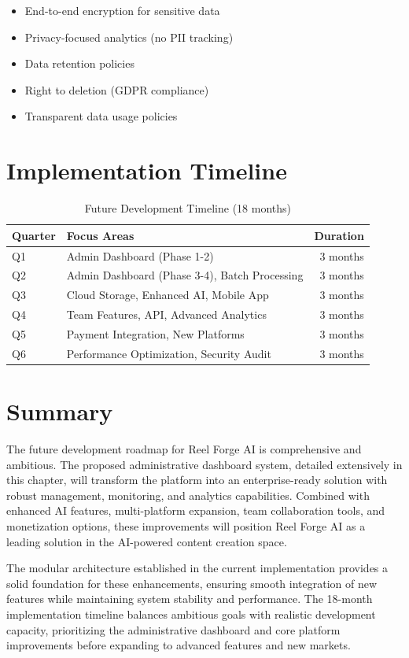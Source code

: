 \begin{itemize}
    \item End-to-end encryption for sensitive data
    \item Privacy-focused analytics (no PII tracking)
    \item Data retention policies
    \item Right to deletion (GDPR compliance)
    \item Transparent data usage policies
\end{itemize}

\section{Implementation Timeline}

\begin{table}[H]
\centering
\caption{Future Development Timeline (18 months)}
\begin{tabular}{@{}llr@{}}
\toprule
\textbf{Quarter} & \textbf{Focus Areas} & \textbf{Duration} \\
\midrule
Q1 & Admin Dashboard (Phase 1-2) & 3 months \\
Q2 & Admin Dashboard (Phase 3-4), Batch Processing & 3 months \\
Q3 & Cloud Storage, Enhanced AI, Mobile App & 3 months \\
Q4 & Team Features, API, Advanced Analytics & 3 months \\
Q5 & Payment Integration, New Platforms & 3 months \\
Q6 & Performance Optimization, Security Audit & 3 months \\
\bottomrule
\end{tabular}
\end{table}

\section{Summary}

The future development roadmap for Reel Forge AI is comprehensive and ambitious. The proposed administrative dashboard system, detailed extensively in this chapter, will transform the platform into an enterprise-ready solution with robust management, monitoring, and analytics capabilities. Combined with enhanced AI features, multi-platform expansion, team collaboration tools, and monetization options, these improvements will position Reel Forge AI as a leading solution in the AI-powered content creation space.

The modular architecture established in the current implementation provides a solid foundation for these enhancements, ensuring smooth integration of new features while maintaining system stability and performance. The 18-month implementation timeline balances ambitious goals with realistic development capacity, prioritizing the administrative dashboard and core platform improvements before expanding to advanced features and new markets.
